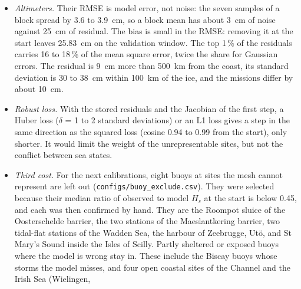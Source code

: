 \documentclass[11pt,a4paper]{article}
\begin{document}
\begin{itemize}
Over the buoy hours of both windows it is \SI{+9}{cm} for observed $H_s$
below \SI{0.5}{m}, $-1$ to \SI{-3}{cm} at 0.5 to \SI{1.5}{m}, \SI{-15}{cm}
at 2 to \SI{3}{m}, \SI{-23}{cm} at 3 to \SI{4}{m}, \SI{-32}{cm} at 4 to
\SI{6}{m} and \SI{-55}{cm} above \SI{6}{m}. It becomes more negative as
the wind at the node exceeds \SI{12}{m/s}. The altimeters show the same
shape: \SI{+5}{} to \SI{+9}{cm} at 1.5 to \SI{3}{m}, where most of their
blocks lie, and \SI{-12}{} to \SI{-77}{cm} above \SI{4}{m}. Constant
parameters lower $H_s$ in every class, so they fit the moderate seas and
worsen the storms: after the third step the buoy bias above \SI{6}{m} is
\SI{-75}{cm}. This dependence on the sea state and the wind is what
\texttt{BETAMAX}($U$), a wind correction, or the ERA5 wind itself have to
explain.
\item \emph{Altimeters.} Their RMSE is model error, not noise: the seven
samples of a block spread by 3.6 to \SI{3.9}{cm}, so a block mean has
about \SI{3}{cm} of noise against \SI{25}{cm} of residual. The bias is
small in the RMSE: removing it at the start leaves \SI{25.83}{cm} on the
validation window. The top 1\,\% of the residuals carries 16 to 18\,\% of
the mean square error, twice the share for Gaussian errors. The residual
is \SI{+9}{cm} more than \SI{500}{km} from the coast, its standard
deviation is 30 to \SI{38}{cm} within \SI{100}{km} of the ice, and the
missions differ by about \SI{10}{cm}.
\item \emph{Robust loss.} With the stored residuals and the Jacobian of
the first step, a Huber loss ($\delta$ = 1 to 2 standard deviations) or
an L1 loss gives a step in the same direction as the squared loss
(cosine 0.94 to 0.99 from the start), only shorter. It would limit the
weight of the unrepresentable sites, but not the conflict between sea
states.
\item \emph{Third cost.} For the next calibrations, eight buoys at
sites the mesh cannot represent are left out (\texttt{configs/buoy\_exclude.csv}).
They were selected because their median ratio of observed to model $H_s$
at the start is below 0.45, and each was then confirmed by hand. They are
the Roompot sluice of the Oosterschelde barrier, the two stations of the
Maeslantkering barrier, two tidal-flat stations of the Wadden Sea, the
harbour of Zeebrugge, Ut\"o, and St Mary's Sound inside the Isles of
Scilly. Partly sheltered or exposed buoys where the model is wrong stay
in. These include the Biscay buoys whose storms the model misses, and
four open coastal sites of the Channel and the Irish Sea (Wielingen,

\end{itemize}
\end{document}
